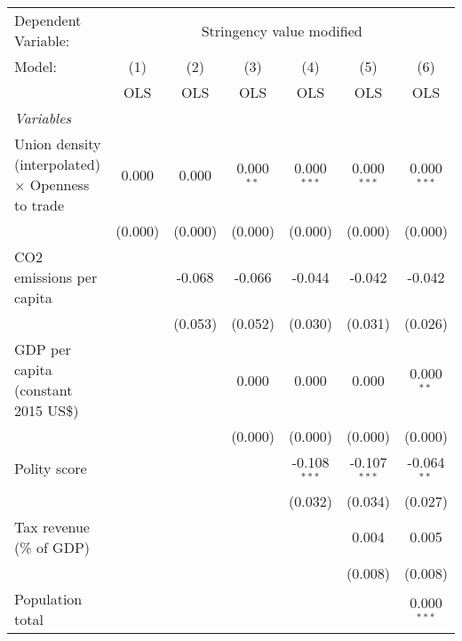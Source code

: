
\begingroup
\centering
\begin{tabular}{lcccccc}
   \toprule
   Dependent Variable: & \multicolumn{6}{c}{Stringency value modified}\\
   Model:                                                   & (1)     & (2)     & (3)          & (4)            & (5)            & (6)\\  
                                                            &  OLS    & OLS     & OLS          & OLS            & OLS            & OLS\\  
   \midrule
   \emph{Variables}\\
   Union density (interpolated) $\times$ Openness to trade  & 0.000   & 0.000   & 0.000$^{**}$ & 0.000$^{***}$  & 0.000$^{***}$  & 0.000$^{***}$\\   
                                                            & (0.000) & (0.000) & (0.000)      & (0.000)        & (0.000)        & (0.000)\\   
   CO2 emissions per capita                                 &         & -0.068  & -0.066       & -0.044         & -0.042         & -0.042\\   
                                                            &         & (0.053) & (0.052)      & (0.030)        & (0.031)        & (0.026)\\   
   GDP per capita (constant 2015 US\$)                      &         &         & 0.000        & 0.000          & 0.000          & 0.000$^{**}$\\   
                                                            &         &         & (0.000)      & (0.000)        & (0.000)        & (0.000)\\   
   Polity score                                             &         &         &              & -0.108$^{***}$ & -0.107$^{***}$ & -0.064$^{**}$\\   
                                                            &         &         &              & (0.032)        & (0.034)        & (0.027)\\   
   Tax revenue (\% of GDP)                                  &         &         &              &                & 0.004          & 0.005\\   
                                                            &         &         &              &                & (0.008)        & (0.008)\\   
   Population total                                         &         &         &              &                &                & 0.000$^{***}$\\   

\end{tabular}

